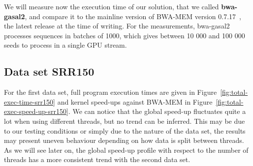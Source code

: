 We will measure now the execution time of our solution, that we called \textbf{bwa-gasal2}, and compare it to the mainline version of BWA-MEM version 0.7.17~\cite{lh3:bwa}, the latest release at the time of writing. For the measurements, bwa-gasal2 processes sequences in batches of 1000, which gives between 10 000 and 100 000 seeds to process in a single GPU stream.

\subsection{Data set SRR150}

For the first data set, full program execution times are given in Figure~\ref{fig:total-exec-time-srr150} and kernel speed-ups against BWA-MEM in Figure~\ref{fig:total-exec-speed-up-srr150}. We can notice that the global speed-up fluctuates quite a lot when using different threads, but no trend can be inferred. This may be due to our testing conditions or simply due to the nature of the data set, the results may present uneven behaviour depending on how data is split between threads. As we will see later on, the global speed-up profile with respect to the number of threads has a more consistent trend with the second data set.

